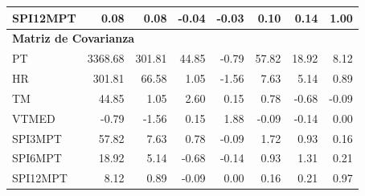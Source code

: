 \begin{table}[ht]
\begin{tabular}{lrrrrrrr}
SPI12MPT & 0.08 & 0.08 & -0.04 & -0.03 & 0.10 & 0.14 & 1.00 \\
\midrule
\multicolumn{8}{l}{\textbf{Matriz de Covarianza}} \\
\midrule
PT       & 3368.68 & 301.81 & 44.85 & -0.79 & 57.82 & 18.92 & 8.12 \\
HR       & 301.81 & 66.58 & 1.05 & -1.56 & 7.63 & 5.14 & 0.89 \\
TM       & 44.85 & 1.05 & 2.60 & 0.15 & 0.78 & -0.68 & -0.09 \\
VTMED    & -0.79 & -1.56 & 0.15 & 1.88 & -0.09 & -0.14 & 0.00 \\
SPI3MPT  & 57.82 & 7.63 & 0.78 & -0.09 & 1.72 & 0.93 & 0.16 \\
SPI6MPT  & 18.92 & 5.14 & -0.68 & -0.14 & 0.93 & 1.31 & 0.21 \\
SPI12MPT & 8.12 & 0.89 & -0.09 & 0.00 & 0.16 & 0.21 & 0.97 \\
\bottomrule
\end{tabular}
\end{table}






